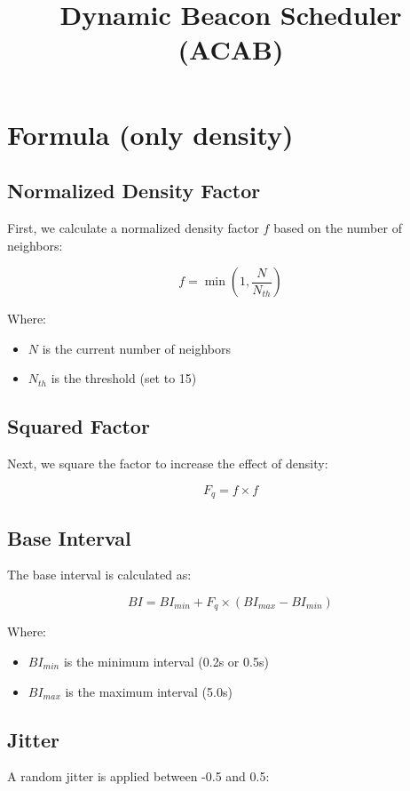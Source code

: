 \documentclass{article}
\title{Dynamic Beacon Scheduler (ACAB)}
\author{}
\date{}
\begin{document}
\maketitle

\section{Formula (only density)}

\subsection{Normalized Density Factor}
First, we calculate a normalized density factor $f$ based on the number of neighbors:

\begin{equation}
f = \min(1, \frac{N}{N_{th}})
\end{equation}

Where:
\begin{itemize}
    \item $N$ is the current number of neighbors
    \item $N_{th}$ is the threshold (set to 15)
\end{itemize}

\subsection{Squared Factor}
Next, we square the factor to increase the effect of density:

\begin{equation}
F_q = f \times f
\end{equation}

\subsection{Base Interval}
The base interval is calculated as:

\begin{equation}
BI = BI_{min} + F_q \times (BI_{max} - BI_{min})
\end{equation}

Where:
\begin{itemize}
    \item $BI_{min}$ is the minimum interval (0.2s or 0.5s)
    \item $BI_{max}$ is the maximum interval (5.0s)
\end{itemize}

\subsection{Jitter}
A random jitter is applied between -0.5 and 0.5:
\end{document}
